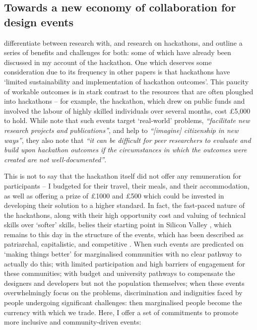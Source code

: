 \subsection{Towards a new economy of collaboration for design events}
\label{DiscussionThree}
\cite{falk_olesen_10_2020} differentiate between research with, and research on hackathons, and outline a series of benefits and challenges for both: some of which have already been discussed in my account of the hackathon. One which deserves some consideration due to its frequency in other papers \citep{hope_hackathons_2019,johnson_civic_2014} is that hackathons have ‘limited sustainability and implementation of hackathon outcomes’. This paucity of workable outcomes is in stark contrast to the resources that are often ploughed into hackathons – for example, the hackathon, which drew on public funds and involved the labour of highly skilled individuals over several months, cost £5,000 to hold. While \cite{falk_olesen_10_2020} note that such events target `real-world' problems, \textit{``facilitate new research projects and publications''}, and help to \textit{``[imagine] citizenship in new ways''}, they also note that \textit{``it can be difficult for peer researchers to evaluate and build upon hackathon outcomes if the circumstances in which the outcomes were created are not well-documented''}\citep{falk_olesen_10_2020}.

This is not to say that the hackathon itself did not offer any remuneration for participants – I budgeted for their travel, their meals, and their accommodation, as well as offering a prize of £1000 and £500 which could be invested in developing their solution to a higher standard. In fact, the fast-paced nature of the hackathons, along with their high opportunity cost and valuing of technical skills over `softer' skills, belies their starting point in Silicon Valley  \citep{irani_hackathons_2015}, which remains to this day in the structure of the events, which has been described as patriarchal, capitalistic, and competitive \citep{evans_disruption_2018}. When such events are predicated on ‘making things better’ for marginalised communities with no clear pathway to actually do this; with limited participation and high barriers of engagement for these communities; with budget and university pathways to compensate the designers and developers but not the population themselves; when these events overwhelmingly focus on the problems, discrimination and indignities faced by people undergoing significant challenges: then marginalised people become the currency with which we trade. Here, I offer a set of commitments to promote more inclusive and community-driven events:

